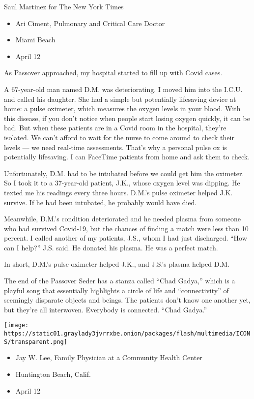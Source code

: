Saul Martinez for The New York Times

\begin{itemize}
\tightlist
\item
  Ari Ciment, Pulmonary and Critical Care Doctor
\item
  Miami Beach
\item
  April 12
\end{itemize}

As Passover approached, my hospital started to fill up with Covid cases.

A 67-year-old man named D.M. was deteriorating. I moved him into the
I.C.U. and called his daughter. She had a simple but potentially
lifesaving device at home: a pulse oximeter, which measures the oxygen
levels in your blood. With this disease, if you don't notice when people
start losing oxygen quickly, it can be bad. But when these patients are
in a Covid room in the hospital, they're isolated. We can't afford to
wait for the nurse to come around to check their levels --- we need
real-time assessments. That's why a personal pulse ox is potentially
lifesaving. I can FaceTime patients from home and ask them to check.

Unfortunately, D.M. had to be intubated before we could get him the
oximeter. So I took it to a 37-year-old patient, J.K., whose oxygen
level was dipping. He texted me his readings every three hours. D.M.'s
pulse oximeter helped J.K. survive. If he had been intubated, he
probably would have died.

Meanwhile, D.M.'s condition deteriorated and he needed plasma from
someone who had survived Covid-19, but the chances of finding a match
were less than 10 percent. I called another of my patients, J.S., whom I
had just discharged. ``How can I help?'' J.S. said. He donated his
plasma. He was a perfect match.

In short, D.M.'s pulse oximeter helped J.K., and J.S.'s plasma helped
D.M.

The end of the Passover Seder has a stanza called ``Chad Gadya,'' which
is a playful song that essentially highlights a circle of life and
``connectivity'' of seemingly disparate objects and beings. The patients
don't know one another yet, but they're all interwoven. Everybody is
connected. ``Chad Gadya.''

\texttt{[image: https://static01.graylady3jvrrxbe.onion/packages/flash/multimedia/ICONS/transparent.png]}

\begin{itemize}
\tightlist
\item
  Jay W. Lee, Family Physician at a Community Health Center
\item
  Huntington Beach, Calif.
\item
  April 12
\end{itemize}

